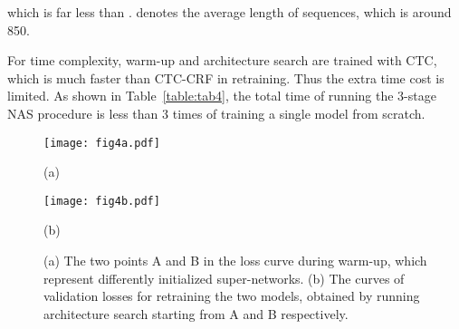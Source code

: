 \documentclass{article}
\newcommand{\tabref}{Table~\ref}
\begin{document}
which is far less than .  denotes the average length of sequences, which is around 850.

For time complexity, warm-up and architecture search are trained with CTC, which is much faster than CTC-CRF in retraining. Thus the extra time cost is limited.
As shown in \tabref{table:tab4}, the total time of running the 3-stage NAS procedure is less than 3 times of training a single model from scratch.

\begin{table}[t]
    \centering
\end{table}
\begin{figure}[t]
\begin{minipage}[b]{0.48\linewidth}
        \centering
        \texttt{[image: fig4a.pdf]}
        \centerline{(a)}
    \end{minipage}
\begin{minipage}[b]{0.48\linewidth}
        \centering
        \texttt{[image: fig4b.pdf]}
        \centerline{(b)}
    \end{minipage}
    \vspace{-2mm}
    \caption{(a) The two points A and B in the loss curve during warm-up, which represent differently initialized super-networks. (b) The curves of validation losses for retraining the two models, obtained by running architecture search starting from A and B respectively.}
    \label{fig:method:effectSPI}
\end{figure}
\end{document}
